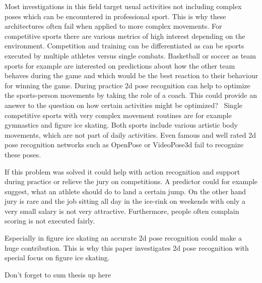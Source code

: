 \par
%
Most investigations in this field target usual activities not including complex poses which can be encountered in
professional sport.
This is why these architectures often fail when applied to more complex movements.
For competitive sports there are various metrics of high interest depending on the environment.
Competition and training can be differentiated as can be sports executed by multiple athletes versus single combats.
Basketball or soccer as team sports for example are interested on predictions about
how the other team behaves during the game and which would be the best reaction to their behaviour for winning
the game.
During practice 2d pose recognition can help to optimize the sports-person movements by taking the role of a coach.
This could provide an answer to the question on how certain activities might be optimized? \
Single competitive sports with very complex movement routines are for example gymnastics and figure ice skating.
Both sports include various artistic body movements, which are not part of daily activities.
Even famous and well rated 2d pose recognition networks such as OpenPose or VideoPose3d fail to recognize these
poses.\\
\par
%
If this problem was solved it could help with action recognition and support during practice or relieve the jury
on competitions.
A predictor could for example suggest, what an athlete should do to land a certain jump.
On the other hand jury is rare and the job sitting all day in the ice-rink on weekends with only a very small
salary is not very attractive.
Furthermore, people often complain scoring is not executed fairly.\\
\par
%
Especially in figure ice skating an accurate 2d pose recognition could make a huge contribution.
This is why this paper investigates 2d pose recognition with special focus on figure ice skating.

Don't forget to sum thesis up here




